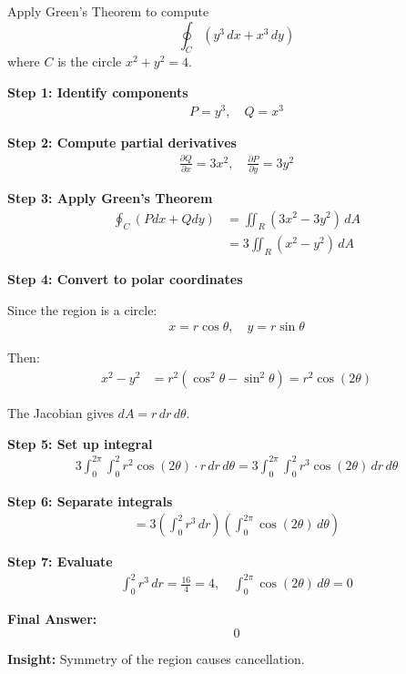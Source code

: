 \begin{examplebox}
    Apply Green's Theorem to compute
    \begin{equation*}
        \oint_C (y^3\,dx + x^3\,dy)
    \end{equation*}
    where $C$ is the circle $x^2 + y^2 = 4$.

    \textbf{Step 1: Identify components}
    \begin{align*}
        P = y^3, \quad Q = x^3
    \end{align*}

    \textbf{Step 2: Compute partial derivatives}
    \begin{align*}
        \frac{\partial Q}{\partial x} = 3x^2, \quad
        \frac{\partial P}{\partial y} = 3y^2
    \end{align*}

    \textbf{Step 3: Apply Green's Theorem}
    \begin{align*}
        \oint_C (Pdx + Qdy)
         & = \iint_R (3x^2 - 3y^2)\, dA \\
         & = 3 \iint_R (x^2 - y^2)\, dA
    \end{align*}

    \textbf{Step 4: Convert to polar coordinates}

    Since the region is a circle:
    \begin{align*}
        x = r\cos\theta, \quad y = r\sin\theta
    \end{align*}

    Then:
    \begin{align*}
        x^2 - y^2 & = r^2(\cos^2\theta - \sin^2\theta) = r^2\cos(2\theta)
    \end{align*}

    The Jacobian gives $dA = r\,dr\,d\theta$.

    \textbf{Step 5: Set up integral}
    \begin{align*}
        3 \int_0^{2\pi} \int_0^2 r^2\cos(2\theta)\cdot r\,dr\,d\theta
        = 3 \int_0^{2\pi} \int_0^2 r^3 \cos(2\theta)\,dr\,d\theta
    \end{align*}

    \textbf{Step 6: Separate integrals}
    \begin{align*}
        = 3 \left( \int_0^2 r^3\,dr \right)\left( \int_0^{2\pi} \cos(2\theta)\,d\theta \right)
    \end{align*}

    \textbf{Step 7: Evaluate}
    \begin{align*}
        \int_0^2 r^3\,dr = \frac{16}{4} = 4, \quad
        \int_0^{2\pi} \cos(2\theta)\,d\theta = 0
    \end{align*}

    \textbf{Final Answer:}
    \begin{equation*}
        \boxed{0}
    \end{equation*}

    \textbf{Insight:} Symmetry of the region causes cancellation.
\end{examplebox}

